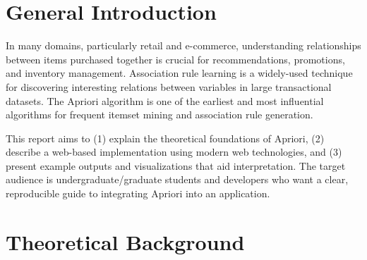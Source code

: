 \documentclass[12pt,a4paper]{report}
\begin{document}
\begin{abstract}
This report presents the Apriori algorithm for association rule learning and describes a practical implementation integrated into a web application. The first part introduces the theoretical foundations of association rules and the key measures—support, confidence and lift. The second part details the system architecture, technology choices (Python backend and a React frontend), preprocessing steps for transforming raw datasets into transaction sets, and the Apriori implementation. The third part demonstrates results, including frequent itemset generation (L1, L2, L3), candidate generation and pruning, and the extraction and interpretation of association rules. Placeholders for screenshots and examples are included to illustrate the user interface and algorithm stages. The report concludes with lessons learned and directions for future work.
\end{abstract}

\tableofcontents
\clearpage

\chapter*{General Introduction}

In many domains, particularly retail and e-commerce, understanding relationships between items purchased together is crucial for recommendations, promotions, and inventory management. Association rule learning is a widely-used technique for discovering interesting relations between variables in large transactional datasets. The Apriori algorithm is one of the earliest and most influential algorithms for frequent itemset mining and association rule generation.

This report aims to (1) explain the theoretical foundations of Apriori, (2) describe a web-based implementation using modern web technologies, and (3) present example outputs and visualizations that aid interpretation. The target audience is undergraduate/graduate students and developers who want a clear, reproducible guide to integrating Apriori into an application.

\chapter{Theoretical Background}
\end{document}
